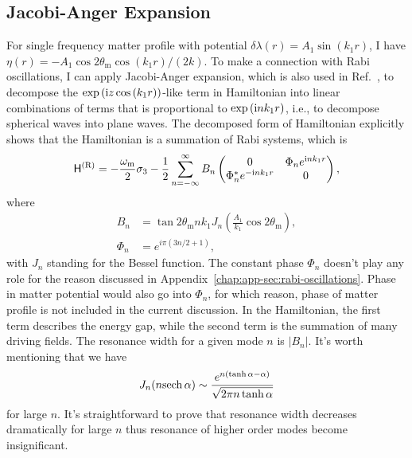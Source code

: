 \subsection{\label{chap:matter-sec:jacobi-subsec:jacobi}Jacobi-Anger Expansion}


For single frequency matter profile with potential $\delta\lambda(r) = A_1\sin(k_1 r)$, I have $\eta(r) = - A_1 \cos 2\theta_{\mathrm m} \cos (k_1 r)/(2 k) $. To make a connection with Rabi oscillations, I can apply Jacobi-Anger expansion, which is also used in Ref.~\cite{Kneller2013}, to decompose the $\exp\left( \mathrm{i} z \cos\left(k_1 r \right) \right)$-like term in Hamiltonian into linear combinations of terms that is proportional to $\exp\left(\mathrm{i} n k_1 r \right)$, i.e., to decompose spherical waves into plane waves. The decomposed form of Hamiltonian explicitly shows that the Hamiltonian is a summation of Rabi systems, which is
\begin{equation}
    \mathsf H^{(\mathrm{R})} =
    -\frac{\omega_{\mathrm{m}}}{2} \sigma_3
    -  \frac{1}{2} \sum_{n=-\infty}^\infty B_n \begin{pmatrix}
    0 &  \Phi_n e^{\ri n k_1  r} \\
     \Phi_n^* e^{ - \ri n k_1 r} & 0
    \end{pmatrix},
    \label{chap:matter-sec:jacobi-eqn:hamil-jacobi-expanded}
\end{equation}
where
\begin{align}
    B_n &= \tan 2\theta_{\mathrm m} n k_1 J_{n} \left( \frac{A_1}{k_1}\cos 2\theta_{\mathrm m} \right),\\
    \Phi_n &= e^{i\pi (3n/2+1)},
\end{align}
with $J_n$ standing for the Bessel function.
The constant phase $\Phi_n$ doesn't play any role for the reason discussed in Appendix~\ref{chap:app-sec:rabi-oscillations}. Phase in matter potential would also go into $\Phi_n$, for which reason, phase of matter profile is not included in the current discussion. In the Hamiltonian, the first term describes the energy gap, while the second term is the summation of many driving fields. The resonance width for a given mode $n$ is $\lvert B_{n}\rvert$. It's worth mentioning that we have~\cite{Ploumistakis20092897}
\begin{equation}
J_n(n {\operatorname{sech}{\alpha}}) \sim \frac{ e^{n(\tanh\alpha - \alpha)} }{\sqrt{ 2\pi n \tanh \alpha } }
\end{equation}
for large $n$. It's straightforward to prove that resonance width decreases dramatically for large $n$ thus resonance of higher order modes become insignificant.



